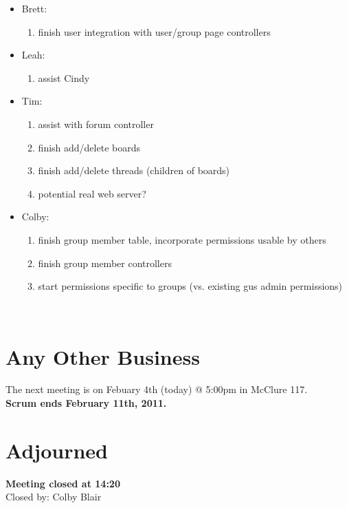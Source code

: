\documentclass[12pt]{article}
\begin{document}
\begin{itemize}
\begin{enumerate}
\end{enumerate}
\item Brett:
\begin{enumerate}
 \item finish user integration with user/group page controllers
\end{enumerate}
\item Leah:
\begin{enumerate}
 \item assist Cindy
\end{enumerate}
\item Tim:
\begin{enumerate}
 \item assist with forum controller
 \item finish add/delete boards
 \item finish add/delete threads (children of boards)
 \item potential real web server?
\end{enumerate}
\item Colby:
\begin{enumerate}
 \item finish group member table, incorporate permissions usable by others
 \item finish group member controllers
 \item start permissions specific to groups (vs. existing gus admin permissions)
\end{enumerate}
\end{itemize}
\\  
\section{Any Other Business}
The next meeting is on Febuary 4th (today) @ 5:00pm in McClure 117. \\
\textbf{Scrum ends February 11th, 2011.}
\\
\section{Adjourned}
\textbf{Meeting closed at 14:20} \\
Closed by: Colby Blair \\
\end{document}
